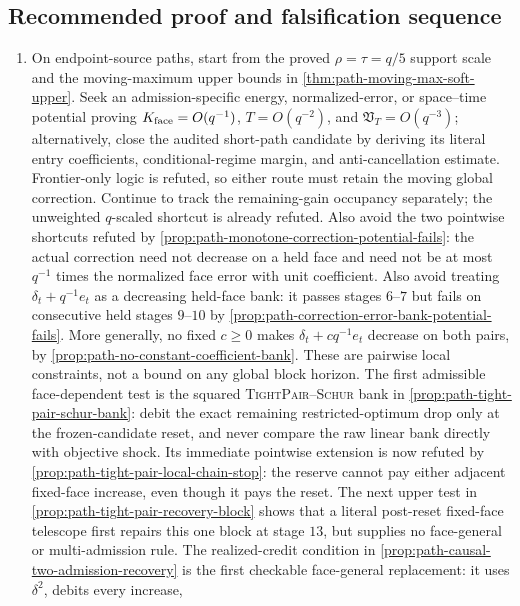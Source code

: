 \subsection{Recommended proof and falsification sequence}

\begin{enumerate}[leftmargin=2em]
\item On endpoint-source paths, start from the proved
$\rho=\tau=q/5$ support scale and the moving-maximum upper bounds in
\cref{thm:path-moving-max-soft-upper}.  Seek an admission-specific energy,
normalized-error, or space--time potential proving
$K_{\rm face}=O(q^{-1})$, $T=O(q^{-2})$, and
$\mathfrak V_T=O(q^{-3})$; alternatively, close the audited short-path
candidate by deriving its literal entry coefficients, conditional-regime
margin, and anti-cancellation estimate.  Frontier-only logic is refuted, so
either route must retain the moving global correction.  Continue to track the
remaining-gain occupancy separately; the unweighted $q$-scaled shortcut is
already refuted.  Also avoid the two pointwise shortcuts refuted by
\cref{prop:path-monotone-correction-potential-fails}: the actual correction
need not decrease on a held face and need not be at most $q^{-1}$ times the
normalized face error with unit coefficient.  Also avoid treating
$\delta_t+q^{-1}e_t$ as a decreasing held-face bank: it passes stages
$6$--$7$ but fails on consecutive held stages $9$--$10$ by
\cref{prop:path-correction-error-bank-potential-fails}.  More generally, no
fixed $c\geq0$ makes $\delta_t+cq^{-1}e_t$ decrease on both pairs, by
\cref{prop:path-no-constant-coefficient-bank}.  These are pairwise local
constraints, not a bound on any global block horizon.  The first admissible
face-dependent test is the squared \textnormal{\textsc{TightPair--Schur}}
bank in \cref{prop:path-tight-pair-schur-bank}: debit the exact remaining
restricted-optimum drop only at the frozen-candidate reset, and never compare
the raw linear bank directly with objective shock.  Its immediate pointwise
extension is now refuted by
\cref{prop:path-tight-pair-local-chain-stop}: the reserve cannot pay either
adjacent fixed-face increase, even though it pays the reset.  The next upper
test in \cref{prop:path-tight-pair-recovery-block} shows that a literal
post-reset fixed-face telescope first repairs this one block at stage $13$,
but supplies no face-general or multi-admission rule.  The realized-credit
condition in \cref{prop:path-causal-two-admission-recovery} is the first
checkable face-general replacement: it uses $\delta^2$, debits every increase,

\end{enumerate}
